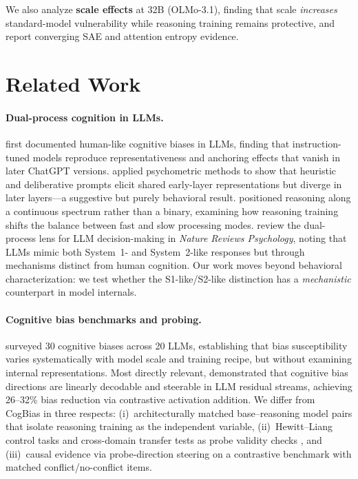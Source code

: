 \documentclass{article}
\newcommand{\sone}{S1-like}
\newcommand{\stwo}{S2-like}
\begin{document}
\noindent We also analyze \textbf{scale effects} at 32B
(OLMo-3.1), finding that scale \emph{increases} standard-model
vulnerability while reasoning training remains protective, and report
converging SAE and attention entropy evidence.


\section{Related Work}
\label{sec:related}

\paragraph{Dual-process cognition in LLMs.}
\citet{hagendorff2023human} first documented human-like cognitive biases
in LLMs, finding that instruction-tuned models reproduce
representativeness and anchoring effects that vanish in later ChatGPT
versions.  \citet{codaforno2025dual} applied psychometric methods to show
that heuristic and deliberative prompts elicit shared early-layer
representations but diverge in later layers---a suggestive but purely
behavioral result.  \citet{ziabari2025reasoning} positioned reasoning
along a continuous spectrum rather than a binary, examining how reasoning
training shifts the balance between fast and slow processing modes.
\citet{brady2025dual} review the dual-process lens for LLM
decision-making in \emph{Nature Reviews Psychology}, noting that LLMs
mimic both System~1- and System~2-like responses but through mechanisms
distinct from human cognition.
Our work moves beyond behavioral characterization: we test whether the
\sone{}/\stwo{} distinction has a \emph{mechanistic} counterpart in
model internals.

\paragraph{Cognitive bias benchmarks and probing.}
\citet{malberg2025cognitive} surveyed 30 cognitive biases across 20 LLMs,
establishing that bias susceptibility varies systematically with model
scale and training recipe, but without examining internal representations.
Most directly relevant, \citet{huang2026cogbias} demonstrated that
cognitive bias directions are linearly decodable and steerable in LLM
residual streams, achieving 26--32\% bias reduction via contrastive
activation addition.  We differ from CogBias in three respects:
(i)~architecturally matched base--reasoning model pairs that isolate
reasoning training as the independent variable, (ii)~Hewitt--Liang
control tasks and cross-domain transfer tests as probe validity checks
\citep{hewitt2019control}, and (iii)~causal evidence via probe-direction
steering on a contrastive benchmark with matched conflict/no-conflict
items.
\end{document}
